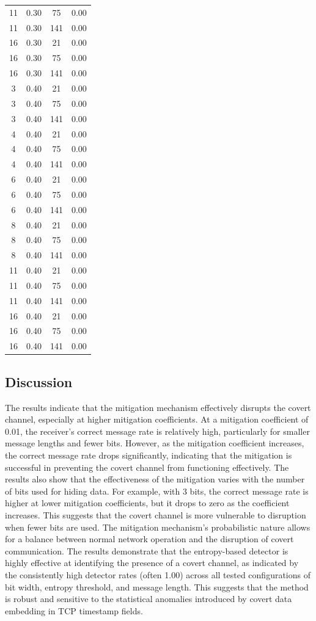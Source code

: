 \documentclass[10pt,a4paper]{article}
\begin{document}
\begin{center}
\begin{longtable}{cccc}
11 & 0.30 & 75  & 0.00 \\
11 & 0.30 & 141 & 0.00 \\
16 & 0.30 & 21  & 0.00 \\
16 & 0.30 & 75  & 0.00 \\
16 & 0.30 & 141 & 0.00 \\
3  & 0.40 & 21  & 0.00 \\
3  & 0.40 & 75  & 0.00 \\
3  & 0.40 & 141 & 0.00 \\
4  & 0.40 & 21  & 0.00 \\
4  & 0.40 & 75  & 0.00 \\
4  & 0.40 & 141 & 0.00 \\
6  & 0.40 & 21  & 0.00 \\
6  & 0.40 & 75  & 0.00 \\
6  & 0.40 & 141 & 0.00 \\
8  & 0.40 & 21  & 0.00 \\
8  & 0.40 & 75  & 0.00 \\
8  & 0.40 & 141 & 0.00 \\
11 & 0.40 & 21  & 0.00 \\
11 & 0.40 & 75  & 0.00 \\
11 & 0.40 & 141 & 0.00 \\
16 & 0.40 & 21  & 0.00 \\
16 & 0.40 & 75  & 0.00 \\
16 & 0.40 & 141 & 0.00 \\
\end{longtable}
\end{center}



\subsection*{Discussion}
The results indicate that the mitigation mechanism effectively disrupts the covert channel, especially at higher mitigation coefficients.
At a mitigation coefficient of 0.01, the receiver's correct message rate is relatively high, particularly for smaller message lengths and fewer bits.
 However, as the mitigation coefficient increases, the correct message rate drops significantly, indicating that the mitigation is successful in preventing the covert channel from functioning effectively.
The results also show that the effectiveness of the mitigation varies with the number of bits used for hiding data.
 For example, with 3 bits, the correct message rate is higher at lower mitigation coefficients, but it drops to zero as the coefficient increases. 
 This suggests that the covert channel is more vulnerable to disruption when fewer bits are used.
The mitigation mechanism's probabilistic nature allows for a balance between normal network operation and the disruption of covert communication.
The results demonstrate that the entropy-based detector is highly effective at identifying the presence of a covert channel, as indicated by the consistently high detector rates (often 1.00) across all tested configurations of bit width, entropy threshold, and message length.
 This suggests that the method is robust and sensitive to the statistical anomalies introduced by covert data embedding in TCP timestamp fields.
\end{document}
